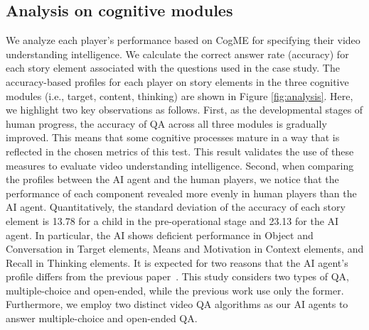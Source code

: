 \documentclass[letterpaper]{article} %
\begin{document}
\subsection{Analysis on cognitive modules}
We analyze each player's performance based on CogME for specifying their video understanding intelligence. We calculate the correct answer rate (accuracy) for each story element associated with the questions used in the case study. The accuracy-based profiles for each player on story elements in the three cognitive modules (i.e., target, content, thinking) are shown in Figure \ref{fig:analysis}. Here, we highlight two key observations as follows. First, as the developmental stages of human progress, the accuracy of QA across all three modules is gradually improved. This means that some cognitive processes mature in a way that is reflected in the chosen metrics of this test. This result validates the use of these measures to evaluate video understanding intelligence.
Second, when comparing the profiles between the AI agent and the human players, we notice that the performance of each component revealed more evenly in human players than the AI agent. Quantitatively, the standard deviation of the accuracy of each story element is 13.78 for a child in the pre-operational stage and 23.13 for the AI agent. In particular, the AI shows deficient performance in Object and Conversation in Target elements, Means and Motivation in Context elements, and Recall in Thinking elements. It is expected for two reasons that the AI agent's profile differs from the previous paper~\cite{shin2021cogme}. This study considers two types of QA, multiple-choice and open-ended, while the previous work use only the former. Furthermore, we employ two distinct video QA algorithms as our AI agents to answer multiple-choice and open-ended QA.


\vspace{-0.84mm}
\vspace{-1.46mm}
\end{document}
